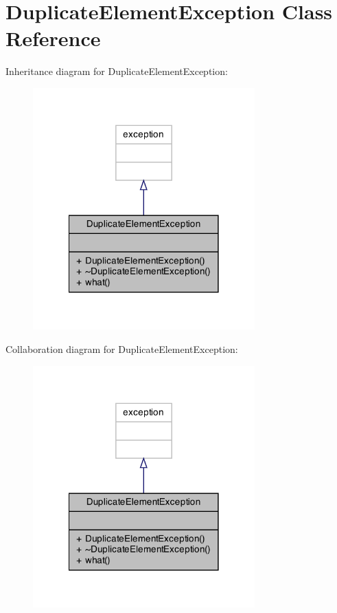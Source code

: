 \hypertarget{class_duplicate_element_exception}{\section{Duplicate\+Element\+Exception Class Reference}
\label{class_duplicate_element_exception}
}


Inheritance diagram for Duplicate\+Element\+Exception\+:\nopagebreak
\begin{figure}[H]
\begin{center}
\leavevmode
\includegraphics[width=242pt]{class_duplicate_element_exception__inherit__graph}
\end{center}
\end{figure}


Collaboration diagram for Duplicate\+Element\+Exception\+:\nopagebreak
\begin{figure}[H]
\begin{center}
\leavevmode
\includegraphics[width=242pt]{class_duplicate_element_exception__coll__graph}
\end{center}
\end{figure}
